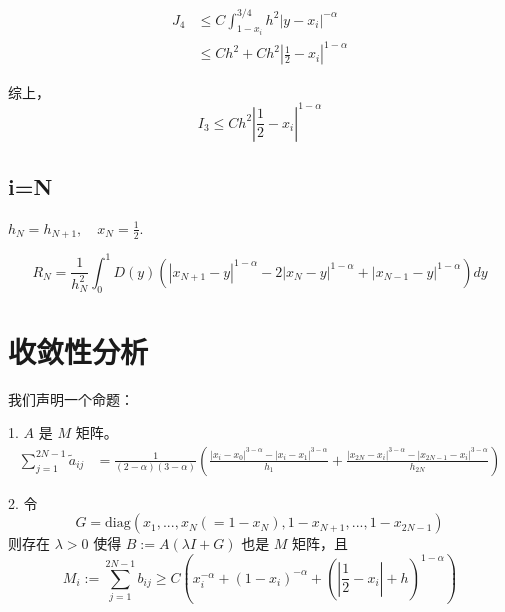 \documentclass{ctexart}
\begin{document}
\begin{equation}
    \begin{aligned}
        J_4 &\le C \int_{1-x_i}^{3/4} h^2 |y-x_i|^{-\alpha} \\
        &\le C h^2 + C h^2 |\frac{1}{2}-x_i|^{1-\alpha}
    \end{aligned}
\end{equation}

综上，
\begin{equation}
    I_3 \le C h^2 |\frac{1}{2}-x_i|^{1-\alpha}
\end{equation}




\newpage
\subsection{i=N}

\(h_N = h_{N+1}, \quad x_N = \frac{1}{2}\).

\begin{equation}
    R_N = \frac{1}{h_{N}^2} \int_0^1 D(y)
    (  |x_{N+1}-y|^{1-\alpha} - 2|x_{N}-y|^{1-\alpha} + |x_{N-1}-y|^{1-\alpha} )  dy
\end{equation}


\section{收敛性分析}

我们声明一个命题：

1. \(A\) 是 \(M\) 矩阵。
\begin{equation}
    \begin{aligned}
        \sum_{j=1}^{2N-1} \tilde{a}_{ij}
        &= \frac{1}{(2-\alpha)(3-\alpha)} \left( \frac{|x_i-x_0|^{3-\alpha} - |x_i-x_1|^{3-\alpha}}{h_1} + \frac{|x_{2N}-x_i|^{3-\alpha} - |x_{2N-1}-x_i|^{3-\alpha}}{h_{2N}} \right)
    \end{aligned}
\end{equation}

% 

2. 令
\begin{equation}
    G = \text{diag}(x_1, ..., x_N(=1-x_N), 1-x_{N+1}, ... , 1-x_{2N-1})
\end{equation}
则存在 \(\lambda>0\) 使得 \(B := A(\lambda I+G)\) 也是 \(M\) 矩阵，且
\begin{equation}
    M_i := \sum_{j=1}^{2N-1} b_{ij} \ge C(x_i^{-\alpha} + (1-x_i)^{-\alpha} + (|\frac{1}{2}-x_i|+h)^{1-\alpha})
\end{equation}
\end{document}
